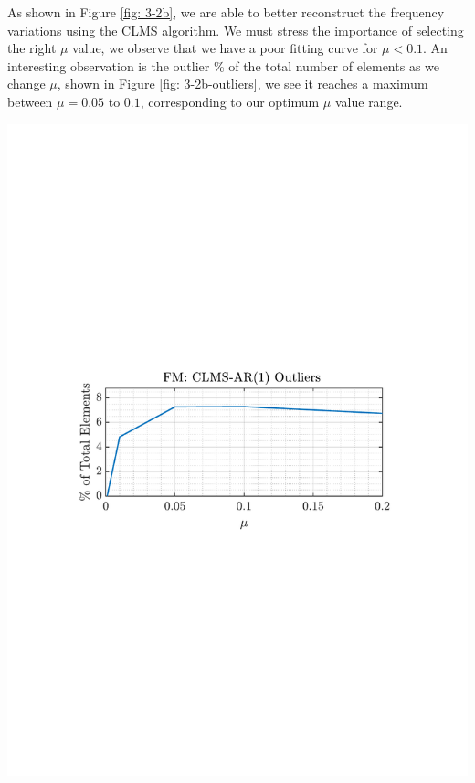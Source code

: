 \documentclass[12pt]{article}
\numberwithin{equation}{section}
\begin{document}
			\begin{minipage}[b]{0.49\textwidth}
				As shown in Figure \ref{fig: 3-2b}, we are able to better reconstruct the frequency variations using the CLMS algorithm. We must stress the importance of selecting the right $\mu$ value, we observe that we have a poor fitting curve for $\mu<0.1$. An interesting observation is the outlier \% of the total number of elements as we change $\mu$, shown in Figure \ref{fig: 3-2b-outliers}, we see it reaches a maximum between $\mu=0.05$ to $0.1$, corresponding to our optimum $\mu$ value range.
			\end{minipage}%
			\begin{minipage}{0.04\textwidth}
				\hspace*{0.04\textwidth}
			\end{minipage}%
			\begin{minipage}[t]{0.49\textwidth}
				\centering
				\includegraphics[trim={2.2cm 11.2cm 3.15cm  11.2cm}, clip, width=\textwidth]{../MATLAB/figures/q3_2b_fig06.pdf} 

				\captionsetup{justification=centering}
				\label{fig: 3-2b-outliers}
			\end{minipage}%
\end{document}
